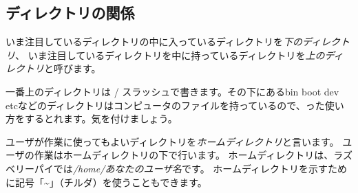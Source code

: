 \begin{tcolorbox}[title=\useOmetoi]
\begin{enumerate}
\end{enumerate}
\end{tcolorbox}

\subsection{ディレクトリの関係}
いま注目しているディレクトリの中に入っているディレクトリを\emph{下のディレクトリ}、
いま注目しているディレクトリを中に持っているディレクトリを\emph{上のディレクトリ}と呼びます。

一番上のディレクトリは / スラッシュで書きます。その下にあるbin boot dev etcなどのディレクトリはコンピュータのファイルを持っているので、った使い方をするとれます。気を付けましょう。

ユーザが作業に使ってもよいディレクトリを\emph{ホームディレクトリ}と言います。
ユーザの作業はホームディレクトリの下で行います。
ホームディレクトリは、ラズベリーパイでは\emph{/home/あなたのユーザ名}です。
ホームディレクトリを示すために記号「\textasciitilde」（チルダ）を使うこともできます。

